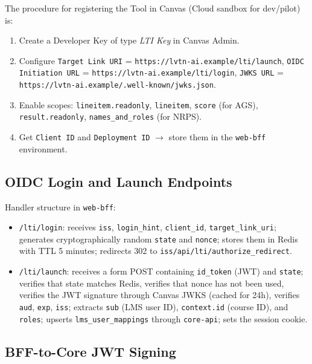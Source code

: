 The procedure for registering the Tool in Canvas (Cloud sandbox for
dev/pilot) is:

\begin{enumerate}
    \item Create a Developer Key of type \textit{LTI Key} in Canvas
          Admin.
    \item Configure \texttt{Target Link URI} =
          \texttt{https://lvtn-ai.example/lti/launch},
          \texttt{OIDC Initiation URL} =
          \texttt{https://lvtn-ai.example/lti/login},
          \texttt{JWKS URL} =
          \texttt{https://lvtn-ai.example/.well-known/jwks.json}.
    \item Enable scopes: \texttt{lineitem.readonly}, \texttt{lineitem},
          \texttt{score} (for AGS), \texttt{result.readonly},
          \texttt{names\_and\_roles} (for NRPS).
    \item Get \texttt{Client ID} and \texttt{Deployment ID} $\to$ store
          them in the \texttt{web-bff} environment.
\end{enumerate}

\subsection{OIDC Login and Launch Endpoints}

Handler structure in \texttt{web-bff}:

\begin{itemize}
    \item \texttt{/lti/login}: receives \texttt{iss},
          \texttt{login\_hint}, \texttt{client\_id},
          \texttt{target\_link\_uri}; generates cryptographically random
          \texttt{state} and \texttt{nonce}; stores them in Redis with
          TTL 5 minutes; redirects 302 to
          \texttt{{iss}/api/lti/authorize\_redirect}.
    \item \texttt{/lti/launch}: receives a form POST containing
          \texttt{id\_token} (JWT) and \texttt{state}; verifies that
          state matches Redis, verifies that nonce has not been used,
          verifies the JWT signature through Canvas JWKS (cached for
          24h), verifies \texttt{aud}, \texttt{exp}, \texttt{iss};
          extracts \texttt{sub} (LMS user ID), \texttt{context.id}
          (course ID), and \texttt{roles}; upserts
          \texttt{lms\_user\_mappings} through \texttt{core-api}; sets
          the session cookie.
\end{itemize}

\subsection{BFF-to-Core JWT Signing}

